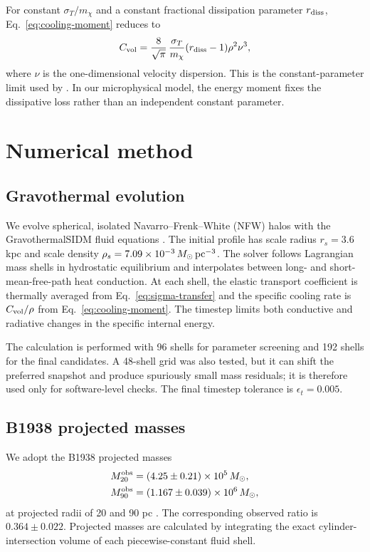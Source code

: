 \documentclass[12pt]{article}
\newcommand{\Msun}{M_\odot}
\newcommand{\sigmavm}{\sigma_T/m_\chi}
\begin{document}
For constant $\sigmavm$ and a constant fractional dissipation parameter
$r_{\rm diss}$, Eq.~\eqref{eq:cooling-moment} reduces to
\begin{equation}
  C_{\rm vol}=\frac{8}{\sqrt{\pi}}\,
  \frac{\sigma_T}{m_\chi}(r_{\rm diss}-1)\rho^2\nu^3,
  \label{eq:constant-cooling}
\end{equation}
where $\nu$ is the one-dimensional velocity dispersion.  This is the
constant-parameter limit used by \citet{Schmidt2026}.  In our microphysical
model, the energy moment fixes the dissipative loss rather than an independent
constant parameter.

\section{Numerical method}
\label{sec:numerics}

\subsection{Gravothermal evolution}

We evolve spherical, isolated Navarro--Frenk--White (NFW) halos
\citep{Navarro1997} with the GravothermalSIDM fluid equations
\citep{Balberg2002,KodaShapiro2011,Nishikawa2020,Outmezguine2023,GadNasr2024}.  The
initial profile has scale radius $r_s=3.6$ kpc and scale density
$\rho_s=7.09\times10^{-3}\,\Msun\,{\rm pc}^{-3}$.  The solver follows
Lagrangian mass shells in hydrostatic equilibrium and interpolates between
long- and short-mean-free-path heat conduction.  At each shell, the elastic
transport coefficient is thermally averaged from Eq.~\eqref{eq:sigma-transfer}
and the specific cooling rate is $C_{\rm vol}/\rho$ from
Eq.~\eqref{eq:cooling-moment}.  The timestep limits both conductive and
radiative changes in the specific internal energy.

The calculation is performed with 96 shells for parameter screening and 192
shells for the final candidates.  A 48-shell grid was also tested, but it can
shift the preferred snapshot and produce spuriously small mass residuals; it
is therefore used only for software-level checks.  The final timestep
tolerance is $\epsilon_t=0.005$.

\subsection{B1938 projected masses}

We adopt the B1938 projected masses
\begin{align}
  M_{20}^{\rm obs}&=(4.25\pm0.21)\times10^5\,\Msun,\\
  M_{90}^{\rm obs}&=(1.167\pm0.039)\times10^6\,\Msun,
  \label{eq:b1938-masses}
\end{align}
at projected radii of 20 and 90 pc \citep{Vegetti2026}.  The corresponding
observed ratio is $0.364\pm0.022$.  Projected masses are calculated by
integrating the exact cylinder-intersection volume of each piecewise-constant
fluid shell.
\end{document}
